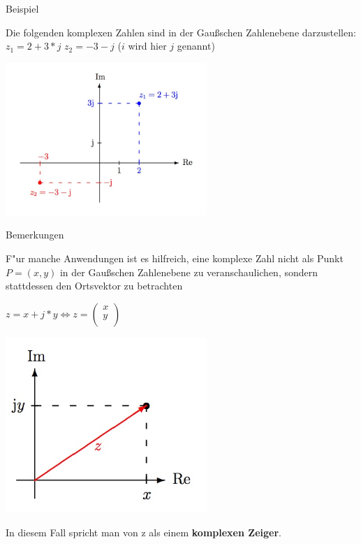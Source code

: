 \begin{Bemerkung}
Beispiel\\
\end{Bemerkung}

Die folgenden komplexen Zahlen sind in der Gaußschen Zahlenebene darzustellen: \\
$z_{1} = 2+3*j$  $z_{2} =-3-j$ ($i$ wird hier $j$ genannt)

\includegraphics[width=3in]{kap6/komplexezahlen2}

\begin{Bemerkung}
Bemerkungen\\
\end{Bemerkung}

F"ur manche Anwendungen ist es hilfreich, eine komplexe Zahl nicht als Punkt $P=(x,y)$ in der Gaußschen Zahlenebene zu veranschaulichen, sondern stattdessen den Ortsvektor zu betrachten

$z=x+j*y \Leftrightarrow z=
\begin{pmatrix}
x\\
y\\
\end{pmatrix}$

\includegraphics[width=3in]{kap6/komplexezahlen3}

In diesem Fall spricht man von z als einem \textbf{komplexen Zeiger}.\\

